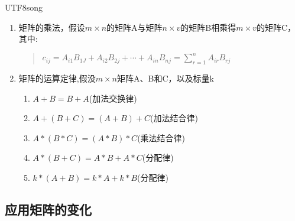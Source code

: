\documentclass[a4paper,10pt]{article}
\begin{document}
\begin{CJK}{UTF8}{song}
\begin{enumerate}
\begin{quote}
\begin{math}
\begin{array}{cccc}
\end{array}
   \right|
\end{math}
\end{quote}
\item 矩阵的乘法，假设$m\times n$的矩阵A与矩阵$n\times v$的矩阵B相乘得$m\times v$的矩阵C，其中:
\begin{quote}
\begin{math}
c_{ij}=A_{i1}B_{1J}+A_{i2}B_{2j}+\cdots{}+A_{in}B_{nj}=\sum_{r=1}^{n}{A_{ir}B_{rj}}
\end{math}
\end{quote}
\item 矩阵的运算定律,假没$m\times n$矩阵A、B和C，以及标量k
\begin{enumerate}
\item $A+B=B+A$(加法交换律)
\item $A+(B+C)=(A+B)+C$(加法结合律)
\item $A*(B*C)=(A*B)*C$(乘法结合律)
\item $A*(B+C)=A*B+A*C$(分配律)
\item $k*(A+B)=k*A+k*B$(分配律)
\end{enumerate}
\end{enumerate}

\subsection{应用矩阵的变化}

\end{CJK}
\end{document}
